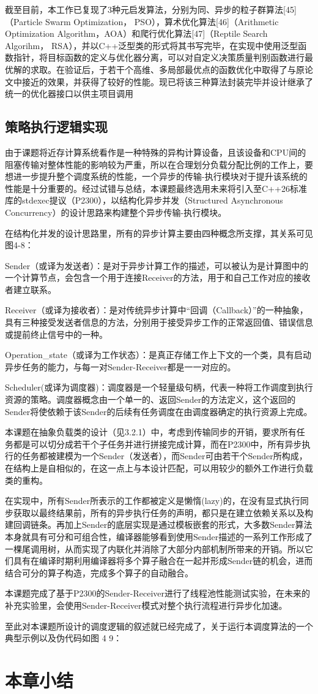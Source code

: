     截至目前，本工作已复现了3种元启发算法，分别为同、异步的粒子群算法[45]（Particle Swarm Optimization， PSO），算术优化算法[46]（Arithmetic Optimization Algorithm，AOA）和爬行优化算法[47]（Reptile Search Algorihm， RSA），并以C++泛型类的形式将其书写完毕，在实现中使用泛型函数指针，将目标函数的定义与优化器分离，可以对自定义决策质量判别函数进行最优解的求取。在验证后，于若干个高维、多局部最优点的函数优化中取得了与原论文中接近的效果，并获得了较好的性能。现已将该三种算法封装完毕并设计继承了统一的优化器接口以供主项目调用

  \subsection{策略执行逻辑实现}\label{subsec:overall_logic_impl}
  由于课题将近存计算系统看作是一种特殊的异构计算设备，且该设备和CPU间的阻塞传输对整体性能的影响较为严重，所以在合理划分负载分配比例的工作上，要想进一步提升整个调度系统的性能，一个异步的传输-执行模块对于提升该系统的性能是十分重要的。经过试错与总结，本课题最终选用未来将引入至C++26标准库的stdexec提议（P2300），以结构化异步并发（Structured Asynchronous Concurrency）的设计思路来构建整个异步传输-执行模块。

  在结构化并发的设计思路里，所有的异步计算主要由四种概念所支撑，其关系可见图4-8：

  Sender（或译为发送者）：是对于异步计算工作的描述，可以被认为是计算图中的一个计算节点，会包含一个用于连接Receiver的方法，用于和自己工作对应的接收者建立联系。

  Receiver（或译为接收者）：是对传统异步计算中“回调（Callback）”的一种抽象，具有三种接受发送者信息的方法，分别用于接受异步工作的正常返回值、错误信息或提前终止信号中的一种。

  Operation\_state（或译为工作状态）：是真正存储工作上下文的一个类，具有启动异步任务的能力，与每一对Sender-Receiver都是一一对应的。

  Scheduler(或译为调度器)：调度器是一个轻量级句柄，代表一种将工作调度到执行资源的策略。调度器概念由一个单一的、返回Sender的方法定义，这个返回的Sender将使依赖于该Sender的后续有任务调度在由调度器确定的执行资源上完成。

  本课题在抽象负载类的设计（见3.2.1）中，考虑到传输同步的开销，要求所有任务都是可以切分成若干个子任务并进行拼接完成计算，而在P2300中，所有异步执行的任务都被建模为一个Sender（发送者），而Sender可由若干个Sender所构成，在结构上是自相似的，在这一点上与本设计匹配，可以用较少的额外工作进行负载类的重构。

  在实现中，所有Sender所表示的工作都被定义是懒惰(lazy)的，在没有显式执行同步获取以最终结果前，所有的异步执行任务的声明，都只是在建立依赖关系以及构建回调链条。再加上Sender的底层实现是通过模板嵌套的形式，大多数Sender算法本身就具有可分和可组合性，编译器能够看到使用Sender描述的一系列工作形成了一棵尾调用树，从而实现了内联化并消除了大部分内部机制所带来的开销。所以它们具有在编译时期利用编译器将多个算子融合在一起并形成Sender链的机会，进而结合可分的算子构造，完成多个算子的自动融合。

  本课题完成了基于P2300的Sender-Receiver进行了线程池性能测试实验，在未来的补充实验里，会使用Sender-Receiver模式对整个执行流程进行异步化加速。

  至此对本课题所设计的调度逻辑的叙述就已经完成了，关于运行本调度算法的一个典型示例以及伪代码如图 4 9：
  

\section{本章小结}\label{sec:chap3_summary}